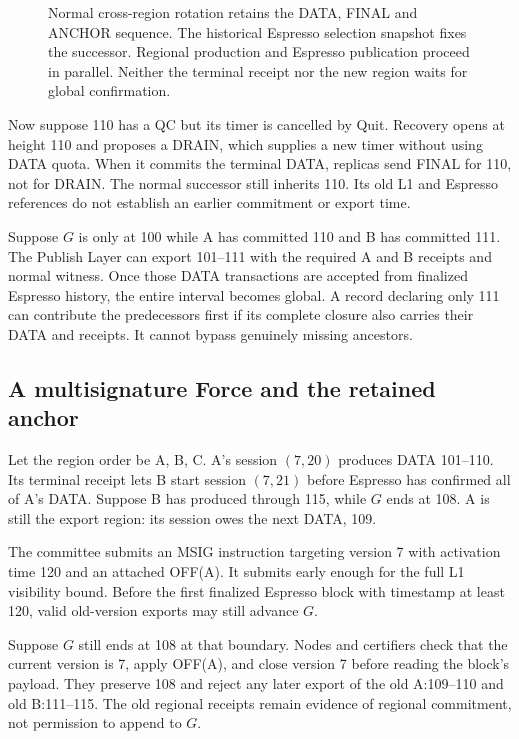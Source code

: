 \documentclass[11pt,a4paper]{article}
\begin{document}
\begin{figure}[htbp]\centering

\caption{Normal cross-region rotation retains the DATA, FINAL and
ANCHOR sequence. The historical Espresso selection snapshot fixes the
successor. Regional production and Espresso publication proceed in
parallel. Neither the terminal receipt nor the new region waits for
global confirmation.}
\label{fig:regular-cross-region}
\end{figure}
\FloatBarrier

Now suppose 110 has a QC but its timer is cancelled by Quit.
Recovery opens at height 110 and proposes a DRAIN, which supplies a
new timer without using DATA quota. When it commits the terminal DATA,
replicas send FINAL for 110, not for DRAIN. The normal successor still
inherits 110. Its old L1 and Espresso references do not establish an
earlier commitment or export time.

Suppose $G$ is only at 100 while A has committed 110 and B has committed
111. The Publish Layer can export 101--111 with the required A and B receipts
and normal witness. Once those DATA transactions are accepted from finalized
Espresso history, the entire interval becomes global. A record declaring
only 111 can contribute the predecessors first if its complete closure
also carries their DATA and receipts. It cannot bypass genuinely missing
ancestors.

\subsection{A multisignature Force and the retained anchor}
\label{sec:force-example}
Let the region order be A, B, C. A's session $(7,20)$ produces
DATA 101--110. Its terminal receipt lets B start session $(7,21)$
before Espresso has confirmed all of A's DATA. Suppose B has produced
through 115, while $G$ ends at 108. A is still the export region:
its session owes the next DATA, 109.

The committee submits an MSIG instruction targeting version 7 with
activation time 120 and an attached OFF(A). It submits early enough
for the full L1 visibility bound. Before the first finalized Espresso
block with timestamp at least 120, valid old-version exports may still
advance $G$.

Suppose $G$ still ends at 108 at that boundary. Nodes and certifiers
check that the current version is 7, apply OFF(A), and close version 7
before reading the block's payload. They preserve 108 and reject any
later export of the old A:109--110 and old B:111--115. The old regional
receipts remain evidence of regional commitment, not permission to
append to $G$.
\end{document}
